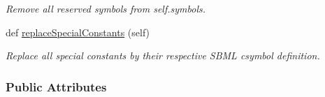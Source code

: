 \begin{DoxyCompactItemize}
\begin{DoxyCompactList}\small\item\em Remove all reserved symbols from self.\+symbols. \end{DoxyCompactList}\item 
def \mbox{\hyperlink{classamici_1_1sbml__import_1_1_sbml_importer_a5348e7b5041334f8c54b45c5c928dea0}{replace\+Special\+Constants}} (self)
\begin{DoxyCompactList}\small\item\em Replace all special constants by their respective S\+B\+ML csymbol definition. \end{DoxyCompactList}\end{DoxyCompactItemize}
\subsubsection*{Public Attributes}
